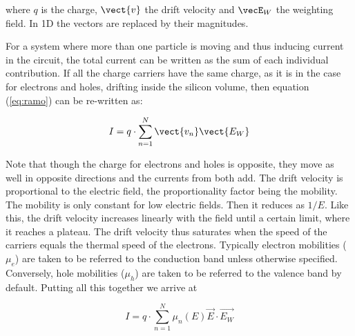 where $q$ is the charge, $\vect{v}$ the drift velocity and $\vecE_{W}$ the weighting
field. In 1D the vectors are replaced by their magnitudes.

For a system where more than one particle is moving and thus inducing current in
the circuit, the total current can be written as the sum of each individual
contribution. If all the charge carriers have the same charge, as it is in the
case for electrons and holes, drifting inside the silicon volume, then equation
(\ref{eq:ramo}) can be re-written as:

\begin{equation}
	I = q \cdot \sum_{n=1}^{N} \vect{v_n}\vect{E_{W}} 	\label{eq:ramoTot} 
\end{equation} 

Note that though the charge for electrons and holes is opposite, they move as
well in opposite directions and the currents from both add. The drift velocity 
is proportional to the electric field, the proportionality factor being 
the mobility. The mobility is only constant for low electric fields. Then 
it reduces as $1/E$. Like this, the drift velocity increases linearly with 
the field until a certain limit, where it reaches a plateau. The drift 
velocity thus saturates when the speed of the carriers equals the thermal 
speed of the electrons. Typically electron mobilities ($ \mu_e $) are taken to 
be referred to the conduction band unless otherwise specified. Conversely, 
hole mobilities ($ \mu_h $) are taken to be referred to the valence band 
by default. Putting all this together we arrive at 

\begin{equation}
	I = q \cdot \sum_{n=1}^{N} \mu_n(E) \vec{E} \cdot \vec{E_{W}} 
\label{eq:ramoMob}
\end{equation}

